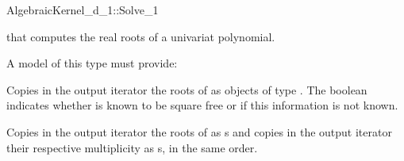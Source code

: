 \begin{ccRefConcept}{AlgebraicKernel_d_1::Solve_1}

\ccDefinition

 that computes the real roots of a univariat polynomial. 
 

A model of this type must provide:

{Copies in the output iterator the roots of  as objects of type 
. The boolean indicates whether  is known 
to be square free or if this information is not known.} 

{Copies in the output iterator  the roots of  as 
s and copies in the output iterator  
their respective multiplicity as s, in the same order.}

\end{ccRefConcept}
